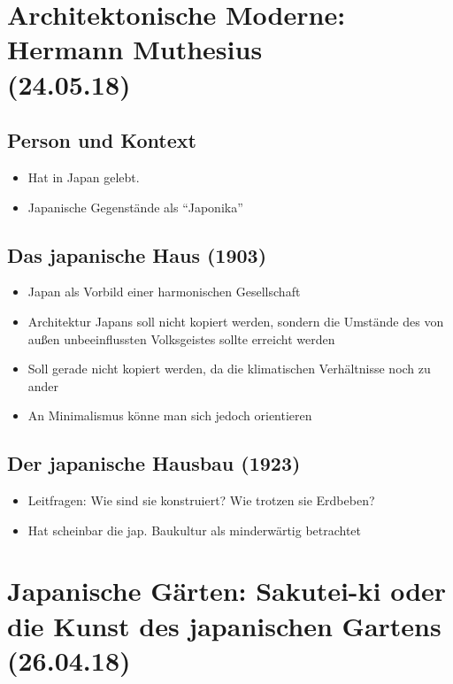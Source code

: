 \documentclass[emulatestandardclasses]{scrartcl}
\begin{document}
\section{Architektonische Moderne: Hermann Muthesius\\(24.05.18)}

\subsection{Person und Kontext}

\begin{itemize}
  \item Hat in Japan gelebt. 
  \item Japanische Gegenstände als "`Japonika"'
\end{itemize}


\subsection{Das japanische Haus (1903)}

\begin{itemize}
  \item Japan als Vorbild einer harmonischen Gesellschaft
  \item Architektur Japans soll nicht kopiert werden, sondern die Umstände des von außen unbeeinflussten Volksgeistes sollte erreicht werden
  \item Soll gerade nicht kopiert werden, da die klimatischen Verhältnisse noch zu ander
  \item An Minimalismus könne man sich jedoch orientieren
\end{itemize}

\subsection{Der japanische Hausbau (1923)}

\begin{itemize}
  \item Leitfragen: Wie sind sie konstruiert? Wie trotzen sie Erdbeben?
  \item Hat scheinbar die jap. Baukultur als minderwärtig betrachtet
\end{itemize}



\section{Japanische Gärten: Sakutei-ki oder die Kunst des japanischen Gartens\\(26.04.18)}
\end{document}
